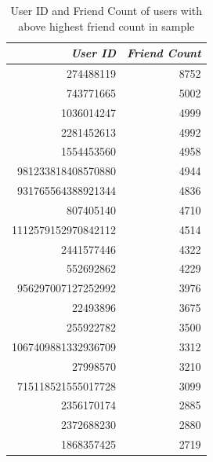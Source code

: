 \documentclass[11pt]{article}
\begin{document}
\begin{table}[htbp]
\caption{\label{tab:orgdbb4a00}User ID and Friend Count of users with above highest friend count in sample}
\centering
\begin{tabular}{rr}
\textbf{\emph{User ID}} & \textbf{\emph{Friend Count}}\\
\hline
274488119 & 8752\\
743771665 & 5002\\
1036014247 & 4999\\
2281452613 & 4992\\
1554453560 & 4958\\
981233818408570880 & 4944\\
931765564388921344 & 4836\\
807405140 & 4710\\
1112579152970842112 & 4514\\
2441577446 & 4322\\
552692862 & 4229\\
956297007127252992 & 3976\\
22493896 & 3675\\
255922782 & 3500\\
1067409881332936709 & 3312\\
27998570 & 3210\\
715118521555017728 & 3099\\
2356170174 & 2885\\
2372688230 & 2880\\
1868357425 & 2719\\
\end{tabular}
\end{table}
\end{document}
